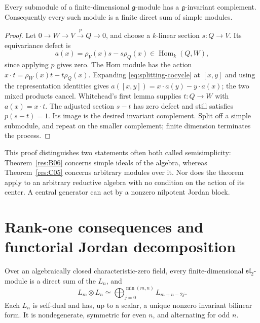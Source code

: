 \begin{theorem}\label{res:C05}
Every submodule of a finite-dimensional
\(\mathfrak g\)-module has a \(\mathfrak g\)-invariant
complement. Consequently every such module is a
finite direct sum of simple modules.
\end{theorem}

\begin{proof}
Let \(0\to W\to V\xrightarrow{p}Q\to0\), and choose
a \(k\)-linear section \(s:Q\to V\).
Its equivariance defect is
\[
 a(x)=\rho_V(x)s-s\rho_Q(x)\in\operatorname{Hom}_k(Q,W),
 \tag{3.7}\label{eq:splitting-cocycle}
\]
since applying \(p\) gives zero. The Hom module has
the action \(x\cdot t=\rho_W(x)t-t\rho_Q(x)\).
Expanding \eqref{eq:splitting-cocycle} at \([x,y]\)
and using the representation identities gives
\(a([x,y])=x\cdot a(y)-y\cdot a(x)\);
the two mixed products cancel.
Whitehead's first lemma supplies \(t:Q\to W\) with
\(a(x)=x\cdot t\).
The adjusted section \(s-t\) has zero defect and
still satisfies \(p(s-t)=1\). Its image is the
desired invariant complement. Split off a simple
submodule, and repeat on the smaller complement;
finite dimension terminates the process.
\end{proof}

This proof distinguishes two statements often both
called semisimplicity: Theorem~\ref{res:B06} concerns
simple ideals of the algebra, whereas
Theorem~\ref{res:C05} concerns arbitrary modules over
it. Nor does the theorem apply to an arbitrary
reductive algebra with no condition on the action of
its center. A central generator can act by a
nonzero nilpotent Jordan block.

\section{Rank-one consequences and functorial Jordan decomposition}

\begin{theorem}
\label{res:C06}
Over an algebraically closed characteristic-zero field,
every finite-dimensional \(\mathfrak{sl}_2\)-module is
a direct sum of the \(L_n\), and
\[
 L_m\otimes L_n\simeq
 \bigoplus_{j=0}^{\min(m,n)}L_{m+n-2j}.
 \tag{3.8}\label{eq:clebsch-gordan}
\]
Each \(L_n\) is self-dual and has, up to a scalar,
a unique nonzero invariant bilinear form. It is
nondegenerate, symmetric for even \(n\), and
alternating for odd \(n\).
\end{theorem}

